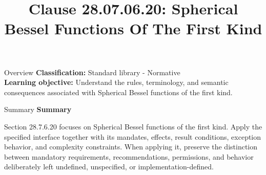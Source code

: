 \documentclass[10pt,letterpaper]{article}
\title{Clause 28.07.06.20: Spherical Bessel Functions Of The First Kind}
\author{}
\date{}
\begin{document}
\maketitle
\begin{CornellOverviewBox}{Overview}
\textbf{Classification:} Standard library - Normative\\[2pt]
\textbf{Learning objective:} Understand the rules, terminology, and semantic consequences associated with Spherical Bessel functions of the first kind.
\end{CornellOverviewBox}\begin{CornellSummaryBox}{Summary}
{\sffamily\bfseries\color{Accent} Summary}\par\vspace{3pt}Section 28.7.6.20 focuses on Spherical Bessel functions of the first kind. Apply the specified interface together with its mandates, effects, result conditions, exception behavior, and complexity constraints. When applying it, preserve the distinction between mandatory requirements, recommendations, permissions, and behavior deliberately left undefined, unspecified, or implementation-defined.
\end{CornellSummaryBox}
\end{document}
